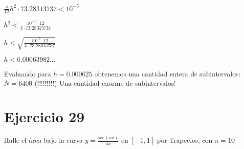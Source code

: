 \documentclass[11pt]{article}
\def\sen{\mathrm{sen}}
\begin{document}
	$\displaystyle \frac{4}{12} h^2 \cdot 73.28313737 <10^{-5}$
	
	$\displaystyle h^2<\frac{10^{-5}\cdot 12}{4 \cdot 73.28313737}$
	
	$\displaystyle h<\sqrt{\frac{10^{-5}\cdot 12}{4 \cdot 73.28313737}}$
	
	$h<0.00063982...$
	
	Evaluando para $h=0.000625$ obtenemos una cantidad entera de subintervalos: $N=6400$ (!!!!!!!!!) Una cantidad enorme de subintervalos!

	

	
	
	\section{Ejercicio 29}
	Halle el área bajo la curva $\displaystyle y=\frac{\sen(\pi x)}{\pi x}$ en $[-1,1]$ por Trapecios, con $n=10$\\
	
\end{document}
